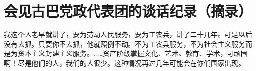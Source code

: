 \section[会见古巴党政代表团的谈话纪录（摘录）（一九六四年十月十六日）]{会见古巴党政代表团的谈话纪录（摘录）}


我这个人老早就讲了，要为劳动人民服务，要为工农兵，讲了二十几年。可是以后没有去抓。只要你不去抓，他就照例不动。不为工农兵服务，不为社会主义服务而是为资本主义封建主义服务。……资产阶级掌握文化、艺术、教育、学术，可顽固啊！尽是他们的人，我们的人很少。这种情况再过几年可能会在你们国家出现。


